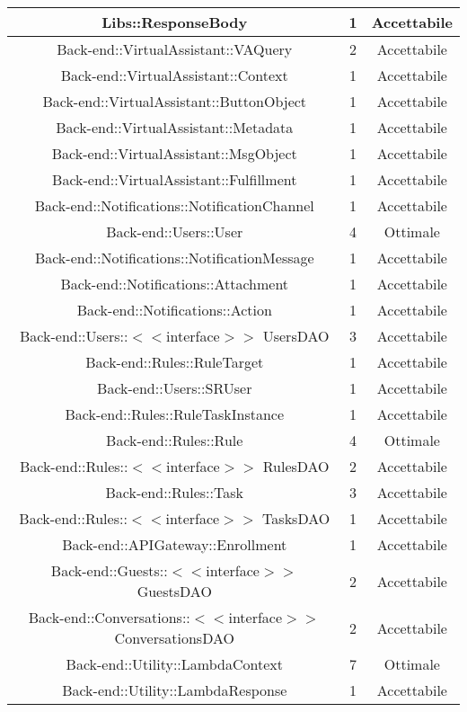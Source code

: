 \begin{longtable}{|c|c|c|}
\hline Libs::ResponseBody & 1 & Accettabile \\
\hline Back-end::VirtualAssistant::VAQuery & 2 & Accettabile \\
\hline Back-end::VirtualAssistant::Context & 1 & Accettabile \\
\hline Back-end::VirtualAssistant::ButtonObject & 1 & Accettabile \\
\hline Back-end::VirtualAssistant::Metadata & 1 & Accettabile \\
\hline Back-end::VirtualAssistant::MsgObject & 1 & Accettabile \\
\hline Back-end::VirtualAssistant::Fulfillment & 1 & Accettabile \\
\hline Back-end::Notifications::NotificationChannel & 1 & Accettabile \\
\hline Back-end::Users::User & 4 & Ottimale \\
\hline Back-end::Notifications::NotificationMessage & 1 & Accettabile \\
\hline Back-end::Notifications::Attachment & 1 & Accettabile \\
\hline Back-end::Notifications::Action & 1 & Accettabile \\
\hline Back-end::Users::$<$$<$interface$>$$>$ UsersDAO & 3 & Accettabile \\
\hline Back-end::Rules::RuleTarget & 1 & Accettabile \\
\hline Back-end::Users::SRUser & 1 & Accettabile \\
\hline Back-end::Rules::RuleTaskInstance & 1 & Accettabile \\
\hline Back-end::Rules::Rule & 4 & Ottimale \\
\hline Back-end::Rules::$<$$<$interface$>$$>$ RulesDAO & 2 & Accettabile \\
\hline Back-end::Rules::Task & 3 & Accettabile \\
\hline Back-end::Rules::$<$$<$interface$>$$>$ TasksDAO & 1 & Accettabile \\
\hline Back-end::APIGateway::Enrollment & 1 & Accettabile \\
\hline Back-end::Guests::$<$$<$interface$>$$>$ GuestsDAO & 2 & Accettabile \\
\hline Back-end::Conversations::$<$$<$interface$>$$>$ ConversationsDAO & 2 & Accettabile \\
\hline Back-end::Utility::LambdaContext & 7 & Ottimale \\
\hline Back-end::Utility::LambdaResponse & 1 & Accettabile \\

\end{longtable}
